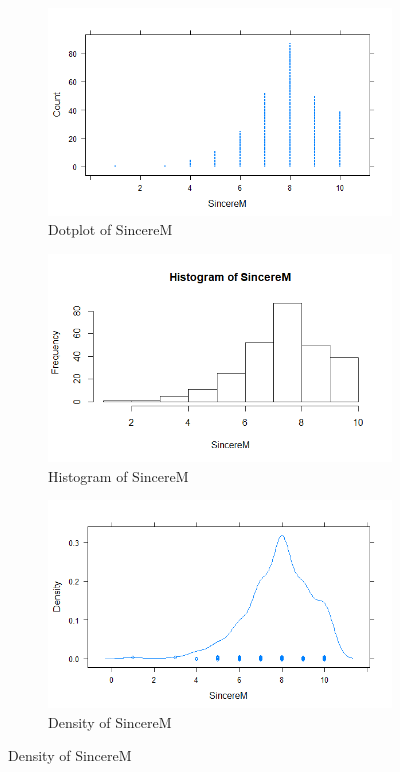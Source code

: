 \documentclass[a4paper,12pt]{article}
\begin{document}
\begin{enumerate}[label = {\alph*)}]
\begin{itemize}
					\begin{figure}[H]
						\centering
						\begin{subfigure}[b]{0.8\linewidth}
							\includegraphics[width=\linewidth]{Images/dotplot3}
							\caption{Dotplot of SincereM}
						\end{subfigure}
						\begin{subfigure}[b]{0.4\linewidth}
							\includegraphics[width=\linewidth]{Images/Rplot4}
							\caption{Histogram of SincereM}
						\end{subfigure}
						\begin{subfigure}[b]{0.4\linewidth}
							\includegraphics[width=\linewidth]{Images/denplot3}
							\caption{Density of SincereM}
						\end{subfigure}
						\label{fig:rplot4}
					\end{figure}
					

\end{itemize}
\end{enumerate}
\end{document}
